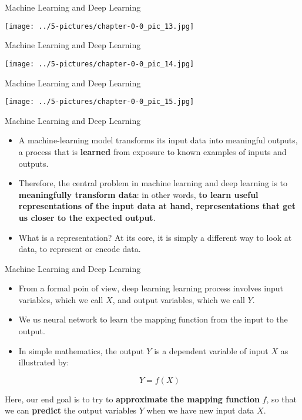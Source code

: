 \documentclass[11pt]{beamer}
\newcommand{\highlight}[1]{%
  \colorbox{yellow!100}{$\displaystyle#1$}}
\begin{document}
\begin{frame}{Machine Learning and Deep Learning}
\begin{center}
\texttt{[image: ../5-pictures/chapter-0-0\_pic\_13.jpg]} 
\end{center}
\end{frame}
\begin{frame}{Machine Learning and Deep Learning}
\begin{center}
\texttt{[image: ../5-pictures/chapter-0-0\_pic\_14.jpg]} 
\end{center}
\end{frame}
\begin{frame}{Machine Learning and Deep Learning}
\begin{center}
\texttt{[image: ../5-pictures/chapter-0-0\_pic\_15.jpg]} 
\end{center}
\end{frame}
\begin{frame}{Machine Learning and Deep Learning}
	\begin{itemize}
		\item A machine-learning model transforms its input data into meaningful outputs, a process that is \textbf{learned} from exposure to known examples of inputs and outputs. 
		\item Therefore, the central problem in machine learning and deep learning is to \textbf{meaningfully transform data}: in other words, \textbf{to learn useful representations of the input data at hand, representations that get us closer to the expected output}. 
		\item What is a representation? At its core, it is simply a different way to look at data, to represent or encode data.
	\end{itemize}
\end{frame}
\begin{frame}{Machine Learning and Deep Learning}
\begin{itemize}
\item From a formal poin of view, deep learning learning process involves input variables, which we call $X$, and output variables, which we call $Y$. 

\item We us neural network \highlight{\text{to learn the mapping function}} from the input to the output. 

\item In simple mathematics, the output $Y$ is a dependent variable of input $X$ as illustrated by:

$$Y = f(X)$$
\end{itemize}

\begin{tcolorbox}
Here, our end goal is to try to \textbf{approximate the mapping function} $f$, so that we can \textbf{predict} the output variables $Y$ when we have new input data $X$.
\end{tcolorbox}
\end{frame}
\end{document}
